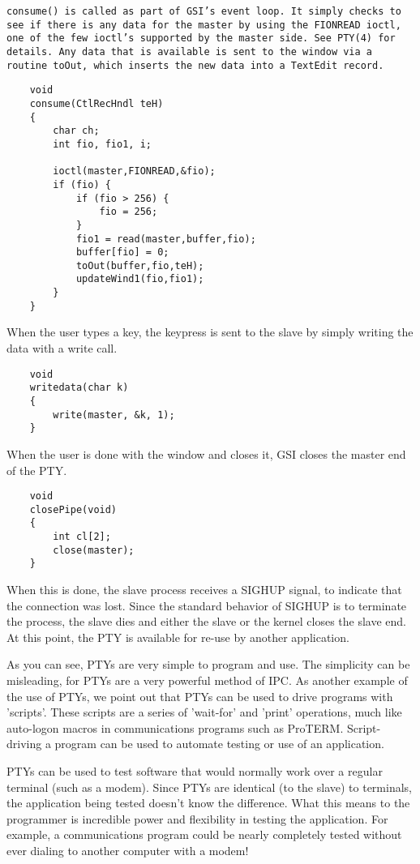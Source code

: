 \documentclass{report}
\begin{document}
\tt consume() \rm
is called as part of GSI's event loop. It simply
checks to see if there is any data for the master by using the
FIONREAD ioctl, one of the few ioctl's supported by the master
side. See PTY(4) for details. Any data that is available is sent
to the window via a routine toOut, which inserts the new data
into a TextEdit record.

\begin{verbatim}
    void 
    consume(CtlRecHndl teH)
    {
        char ch;
        int fio, fio1, i;
    
        ioctl(master,FIONREAD,&fio);
        if (fio) {
            if (fio > 256) {
                fio = 256;
            }
            fio1 = read(master,buffer,fio);
            buffer[fio] = 0;
            toOut(buffer,fio,teH);
            updateWind1(fio,fio1);
        }
    }
\end{verbatim}

When the user types a key, the keypress is
sent to the slave by simply writing the data with a write call.

\begin{verbatim}
    void
    writedata(char k)
    {
        write(master, &k, 1);
    }
\end{verbatim}

When the user is done with the window and
closes it, GSI closes the master end of the PTY.

\begin{verbatim}
    void
    closePipe(void)
    {
        int cl[2];
        close(master);
    }
\end{verbatim}

When this is done, the slave process
receives a SIGHUP signal, to indicate that the connection was
lost. Since the standard behavior of SIGHUP is to terminate the
process, the slave dies and either the slave or the kernel closes
the slave end. At this point, the PTY is available for re-use by
another application.

As you can see, PTYs are very simple to
program and use. The simplicity can be misleading, for PTYs are a
very powerful method of IPC. As another example of the use of
PTYs, we point out that PTYs can be used to drive programs with
'scripts'. These scripts are a series of 'wait-for' and 'print'
operations, much like auto-logon macros in communications
programs such as ProTERM. Script-driving a program can be used to
automate testing or use of an application.

PTYs can be used to test software that
would normally work over a regular terminal (such as a modem).
Since PTYs are identical (to the slave) to terminals, the
application being tested doesn't know the difference. What this
means to the programmer is incredible power and flexibility in
testing the application. For example, a communications program
could be nearly completely tested without ever dialing to another
computer with a modem!
\end{document}
